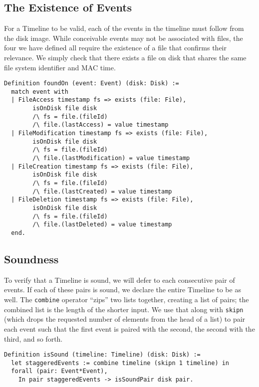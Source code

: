 \documentclass[nocopyrightspace,preprint]{sigplanconf}
\begin{document}
\subsection{The Existence of Events}

For a Timeline to be valid, each of the events in the timeline must follow
from the disk image. While conceivable events may not be associated with
files, the four we have defined all require the existence of a file that
confirms their relevance. We simply check that there exists a file on disk
that shares the same file system identifier and MAC time.

\begin{lstlisting}
Definition foundOn (event: Event) (disk: Disk) :=
  match event with
  | FileAccess timestamp fs => exists (file: File),
        isOnDisk file disk
        /\ fs = file.(fileId)
        /\ file.(lastAccess) = value timestamp
  | FileModification timestamp fs => exists (file: File),
        isOnDisk file disk
        /\ fs = file.(fileId)
        /\ file.(lastModification) = value timestamp
  | FileCreation timestamp fs => exists (file: File),
        isOnDisk file disk
        /\ fs = file.(fileId)
        /\ file.(lastCreated) = value timestamp
  | FileDeletion timestamp fs => exists (file: File),
        isOnDisk file disk
        /\ fs = file.(fileId)
        /\ file.(lastDeleted) = value timestamp
  end.
\end{lstlisting}

\subsection{Soundness}

To verify that a Timeline is sound, we will defer to each consecutive pair of
events. If each of these pairs is sound, we declare the entire Timeline to be
as well. The {\tt combine} operator ``zips'' two lists together, creating a
list of pairs; the combined list is the length of the shorter input. We use
that along with {\tt skipn} (which drops the requested number of elements from
the head of a list) to pair each event such that the first event is paired
with the second, the second with the third, and so forth.

\begin{lstlisting}
Definition isSound (timeline: Timeline) (disk: Disk) :=
  let staggeredEvents := combine timeline (skipn 1 timeline) in
  forall (pair: Event*Event),
    In pair staggeredEvents -> isSoundPair disk pair.
\end{lstlisting}
\end{document}
